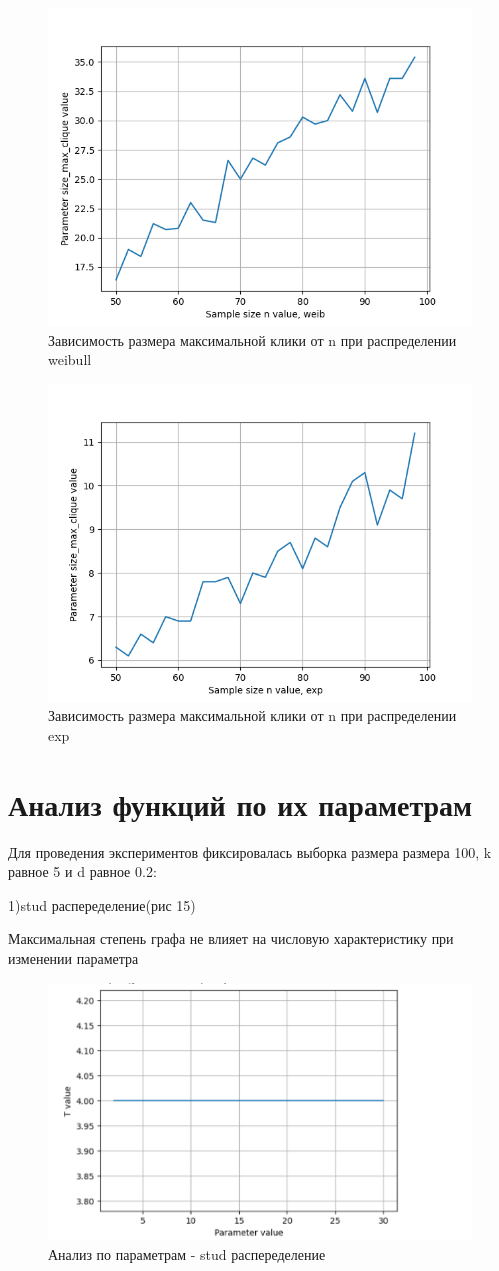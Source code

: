 \documentclass{HSEtitle}
\begin{document}
\begin{figure}[h]
    \centering
    \includegraphics[width=0.65\linewidth]{weib_n.png}
    \caption{Зависимость размера максимальной клики от n при распределении weibull}
    \label{fig:enter-label}
\end{figure}

\begin{figure}[h]
    \centering
    \includegraphics[width=0.65\linewidth]{exp_n.png}
    \caption{Зависимость размера максимальной клики от n при распределении exp}
    \label{fig:enter-label}
\end{figure}


\section{Анализ функций по их параметрам}

Для проведения экспериментов фиксировалась выборка размера размера 100, k равное 5 и d равное 0.2:

1)stud распеределение(рис 15)  

Максимальная степень графа не влияет на числовую характеристику при изменении параметра 
\begin{figure}
    \centering
    \includegraphics[width=0.5\linewidth]{11.png}
    \caption{Анализ по параметрам - stud распеределение}
    \label{fig:enter-label}
\end{figure}
\end{document}
